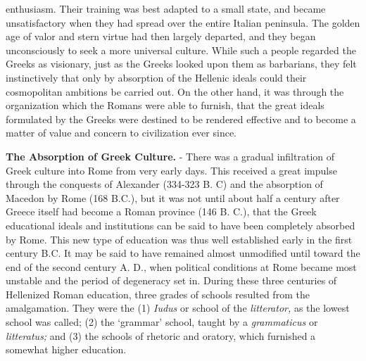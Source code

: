 \documentclass[]{book}
\begin{document}
enthusiasm. Their training was best adapted to a small state, and became unsatisfactory when they had spread over the entire Italian peninsula. The golden age of valor and stern virtue had then largely departed, and they began unconsciously to seek a more universal culture. While such a people regarded the Greeks as visionary, just as the Greeks looked upon them as barbarians, they felt instinctively that only by absorption of the Hellenic ideals could their cosmopolitan ambitions be carried out. On the other hand, it was through the organization which the Romans were able to furnish, that the great ideals formulated by the Greeks were destined to be rendered effective and to become a matter of value and concern to civilization ever since.

\textbf{The Absorption of Greek Culture.} - There was a gradual infiltration of Greek culture into Rome from very early days. This received a great impulse through the conquests of Alexander (334-323 B. C) and the absorption of Macedon by Rome (168 B.C.), but it was not until about half a century after Greece itself had become a Roman province (146 B. C.), that the Greek educational ideals and institutions can be said to have been completely absorbed by Rome. This new type of education was thus well established early in the first century B.C. It may be said to have remained almost unmodified until toward the end of the second century A. D., when political conditions at Rome became most unstable and the period of degeneracy set in. During these three centuries of Hellenized Roman education, three grades of schools resulted from the amalgamation. They were the (1) \emph{Iudus} or school of the \emph{litterator,} as the lowest school was called; (2) the `grammar' school, taught by a \emph{grammaticus} or \emph{litteratus;} and (3) the schools of rhetoric and oratory, which furnished a somewhat higher education.
\end{document}

